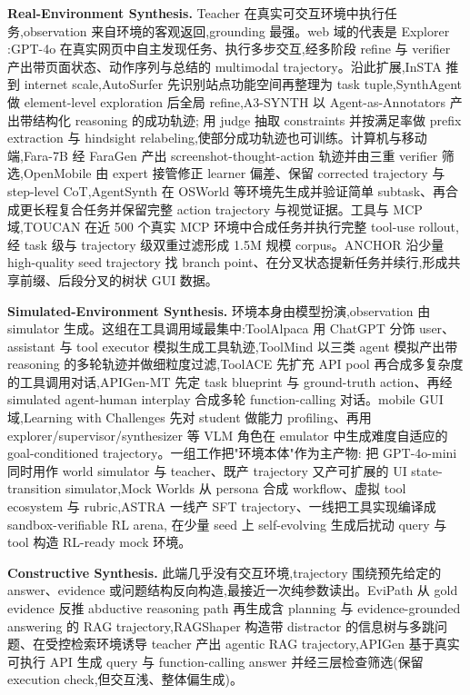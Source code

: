 \textbf{Real-Environment Synthesis.} Teacher 在真实可交互环境中执行任务,observation 来自环境的客观返回,grounding 最强。web 域的代表是 Explorer \cite{Pah25}:GPT-4o 在真实网页中自主发现任务、执行多步交互,经多阶段 refine 与 verifier 产出带页面状态、动作序列与总结的 multimodal trajectory。沿此扩展,InSTA \cite{Tra25} 推到 internet scale,AutoSurfer \cite{Fai26} 先识别站点功能空间再整理为 task tuple,SynthAgent \cite{Wan25ar} 做 element-level exploration 后全局 refine,A3-SYNTH \cite{Lu26} 以 Agent-as-Annotators 产出带结构化 reasoning 的成功轨迹;\cite{Log26b} 用 judge 抽取 constraints 并按满足率做 prefix extraction 与 hindsight relabeling,使部分成功轨迹也可训练。计算机与移动端,Fara-7B \cite{Awa25} 经 FaraGen 产出 screenshot-thought-action 轨迹并由三重 verifier 筛选,OpenMobile \cite{Che26d} 由 expert 接管修正 learner 偏差、保留 corrected trajectory 与 step-level CoT,AgentSynth \cite{Xie25e} 在 OSWorld 等环境先生成并验证简单 subtask、再合成更长程复合任务并保留完整 action trajectory 与视觉证据。工具与 MCP 域,TOUCAN \cite{Xu25o} 在近 500 个真实 MCP 环境中合成任务并执行完整 tool-use rollout,经 task 级与 trajectory 级双重过滤形成 1.5M 规模 corpus。ANCHOR \cite{Wei26b} 沿少量 high-quality seed trajectory 找 branch point、在分叉状态提新任务并续行,形成共享前缀、后段分叉的树状 GUI 数据。

\textbf{Simulated-Environment Synthesis.} 环境本身由模型扮演,observation 由 simulator 生成。这组在工具调用域最集中:ToolAlpaca \cite{Tan23} 用 ChatGPT 分饰 user、assistant 与 tool executor 模拟生成工具轨迹,ToolMind \cite{Yan25ab} 以三类 agent 模拟产出带 reasoning 的多轮轨迹并做细粒度过滤,ToolACE \cite{Liu24o} 先扩充 API pool 再合成多复杂度的工具调用对话,APIGen-MT \cite{Pra25b} 先定 task blueprint 与 ground-truth action、再经 simulated agent-human interplay 合成多轮 function-calling 对话。mobile GUI 域,Learning with Challenges \cite{Kan26b} 先对 student 做能力 profiling、再用 explorer/supervisor/synthesizer 等 VLM 角色在 emulator 中生成难度自适应的 goal-conditioned trajectory。一组工作把"环境本体"作为主产物:\cite{Wan25as} 把 GPT-4o-mini 同时用作 world simulator 与 teacher、既产 trajectory 又产可扩展的 UI state-transition simulator,Mock Worlds \cite{Lu26j} 从 persona 合成 workflow、虚拟 tool ecosystem 与 rubric,ASTRA \cite{Tia26} 一线产 SFT trajectory、一线把工具实现编译成 sandbox-verifiable RL arena,\cite{Xu26e} 在少量 seed 上 self-evolving 生成后扰动 query 与 tool 构造 RL-ready mock 环境。

\textbf{Constructive Synthesis.} 此端几乎没有交互环境,trajectory 围绕预先给定的 answer、evidence 或问题结构反向构造,最接近一次纯参数读出。EviPath \cite{Li25at} 从 gold evidence 反推 abductive reasoning path 再生成含 planning 与 evidence-grounded answering 的 RAG trajectory,RAGShaper \cite{Tao26} 构造带 distractor 的信息树与多跳问题、在受控检索环境诱导 teacher 产出 agentic RAG trajectory,APIGen \cite{Liu24n} 基于真实可执行 API 生成 query 与 function-calling answer 并经三层检查筛选(保留 execution check,但交互浅、整体偏生成)。

